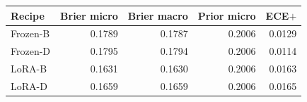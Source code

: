 
{\small\setlength{\tabcolsep}{4pt}
\begin{tabularx}{\textwidth}{Xrrrr}
\toprule
Recipe & Brier micro & Brier macro & Prior micro & ECE$+$ \\
\midrule
Frozen-B & 0.1789 & 0.1787 & 0.2006 & 0.0129 \\
Frozen-D & 0.1795 & 0.1794 & 0.2006 & 0.0114 \\
LoRA-B & 0.1631 & 0.1630 & 0.2006 & 0.0163 \\
LoRA-D & 0.1659 & 0.1659 & 0.2006 & 0.0165 \\
\bottomrule
\end{tabularx}}
